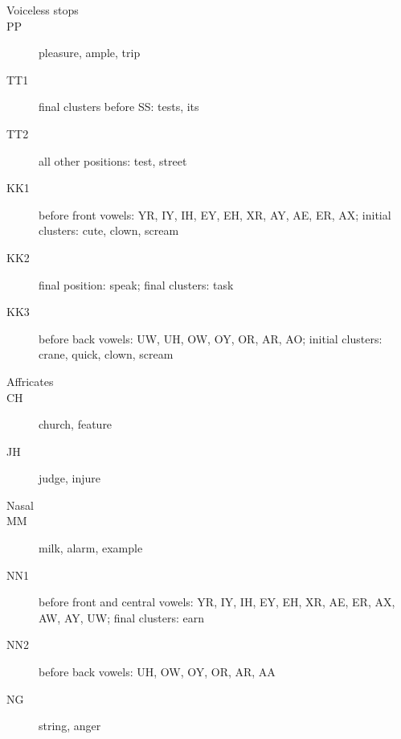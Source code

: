 \begin{description}
	\item[Voiceless stops]
	\item[PP] pleasure, ample, trip
	\item[TT1] final clusters before SS: tests, its
	\item[TT2] all other positions: test, street
	\item[KK1] before front vowels: YR, IY, IH, EY, EH, XR, AY, AE, ER, AX; initial clusters: cute, clown, scream
	\item[KK2] final position: speak; final clusters: task
	\item[KK3] before back vowels: UW, UH, OW, OY, OR, AR, AO; initial clusters: crane, quick, clown, scream
\end{description}

\begin{description}
	\item[Affricates]
	\item[CH] church, feature
	\item[JH] judge, injure
\end{description}

\begin{description}
	\item[Nasal]
	\item[MM] milk, alarm, example
	\item[NN1] before front and central vowels: YR, IY, IH, EY, EH, XR, AE, ER, AX, AW, AY, UW; final clusters: earn
	\item[NN2] before back vowels: UH, OW, OY, OR, AR, AA
	\item[NG] string, anger
\end{description}
